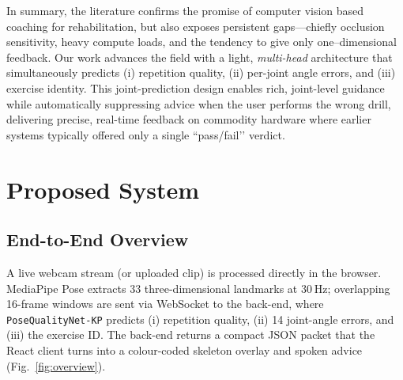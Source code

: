\documentclass{article}
\begin{document}
In summary, the literature confirms the promise of computer vision based coaching for rehabilitation, but also exposes persistent gaps—chiefly occlusion sensitivity, heavy compute loads, and the tendency to give only one–dimensional feedback. Our work advances the field with a light, \emph{multi-head} architecture that simultaneously predicts (i) repetition quality, (ii) per-joint angle errors, and (iii) exercise identity. This joint-prediction design enables rich, joint-level guidance while automatically suppressing advice when the user performs the wrong drill, delivering precise, real-time feedback on commodity hardware where earlier systems typically offered only a single “pass/fail’’ verdict.

\FloatBarrier 

\section{Proposed System}
\label{sec:system}

\subsection{End-to-End Overview}
A live webcam stream (or uploaded clip) is processed directly in the
browser.  MediaPipe Pose extracts 33 three-dimensional landmarks at
30 Hz; overlapping 16-frame windows are sent via WebSocket to the
back-end, where \texttt{PoseQualityNet-KP} predicts (i) repetition
quality, (ii) 14 joint-angle errors, and (iii) the exercise ID.  The
back-end returns a compact JSON packet that the React client turns into
a colour-coded skeleton overlay and spoken advice (Fig.~\ref{fig:overview}).
\end{document}
